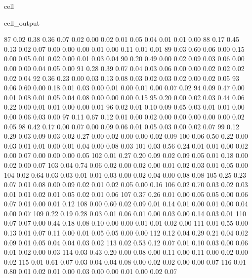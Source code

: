 \documentclass[letterpaper,10pt,english]{jupyterBook}
\begin{document}
\begin{sphinxuseclass}{cell}
\begin{sphinxVerbatimOutput}
\begin{sphinxuseclass}{cell_output}
\begin{sphinxVerbatim}[commandchars=\\\{\}]
        87	0.02 	0.38 	0.36 	0.07 	0.02 	0.00 	0.02 	0.01 	0.05 	0.04 	0.01 	0.01 	0.00
        88	0.17 	0.45 	0.13 	0.02 	0.07 	0.00 	0.00 	0.00 	0.01 	0.00 	0.11 	0.01 	0.01
        89	0.03 	0.60 	0.06 	0.00 	0.15 	0.00 	0.05 	0.01 	0.02 	0.00 	0.01 	0.03 	0.04
        90	0.20 	0.49 	0.00 	0.02 	0.09 	0.03 	0.06 	0.00 	0.00 	0.00 	0.04 	0.05 	0.00
        91	0.28 	0.39 	0.07 	0.04 	0.03 	0.06 	0.00 	0.00 	0.02 	0.02 	0.02 	0.02 	0.04
        92	0.36 	0.23 	0.00 	0.03 	0.13 	0.08 	0.03 	0.02 	0.03 	0.02 	0.00 	0.02 	0.05
        93	0.06 	0.60 	0.00 	0.18 	0.01 	0.03 	0.00 	0.01 	0.00 	0.01 	0.00 	0.07 	0.02
        94	0.09 	0.47 	0.00 	0.01 	0.08 	0.01 	0.05 	0.04 	0.08 	0.00 	0.00 	0.00 	0.15
        95	0.20 	0.00 	0.02 	0.03 	0.44 	0.06 	0.22 	0.00 	0.01 	0.01 	0.00 	0.00 	0.01
        96	0.02 	0.01 	0.10 	0.09 	0.65 	0.03 	0.01 	0.01 	0.00 	0.00 	0.06 	0.03 	0.00
        97	0.11 	0.67 	0.12 	0.01 	0.00 	0.02 	0.00 	0.00 	0.00 	0.00 	0.00 	0.02 	0.05
        98	0.42 	0.17 	0.00 	0.07 	0.00 	0.09 	0.06 	0.01 	0.05 	0.03 	0.00 	0.02 	0.07
        99	0.12 	0.29 	0.03 	0.09 	0.03 	0.02 	0.27 	0.00 	0.02 	0.00 	0.00 	0.02 	0.09
       100	0.06 	0.50 	0.22 	0.00 	0.03 	0.01 	0.01 	0.00 	0.01 	0.04 	0.00 	0.08 	0.03
       101	0.03 	0.56 	0.24 	0.01 	0.01 	0.00 	0.02 	0.00 	0.07 	0.00 	0.00 	0.00 	0.05
       102	0.01 	0.27 	0.20 	0.09 	0.02 	0.09 	0.05 	0.01 	0.18 	0.00 	0.02 	0.00 	0.07
       103	0.04 	0.74 	0.06 	0.02 	0.00 	0.02 	0.00 	0.01 	0.02 	0.03 	0.01 	0.05 	0.00
       104	0.02 	0.64 	0.03 	0.03 	0.01 	0.01 	0.03 	0.00 	0.02 	0.04 	0.00 	0.08 	0.08
       105	0.25 	0.23 	0.07 	0.01 	0.08 	0.00 	0.09 	0.02 	0.01 	0.02 	0.05 	0.00 	0.16
       106	0.02 	0.70 	0.03 	0.02 	0.03 	0.01 	0.01 	0.02 	0.01 	0.05 	0.02 	0.01 	0.06
       107	0.37 	0.26 	0.01 	0.00 	0.05 	0.05 	0.00 	0.06 	0.07 	0.01 	0.00 	0.01 	0.12
       108	0.00 	0.60 	0.02 	0.09 	0.01 	0.14 	0.01 	0.00 	0.01 	0.00 	0.04 	0.00 	0.07
       109	0.22 	0.19 	0.28 	0.03 	0.01 	0.06 	0.01 	0.00 	0.03 	0.00 	0.14 	0.03 	0.01
       110	0.07 	0.07 	0.00 	0.44 	0.18 	0.08 	0.10 	0.00 	0.00 	0.01 	0.01 	0.02 	0.00
       111	0.01 	0.55 	0.00 	0.13 	0.01 	0.07 	0.11 	0.00 	0.01 	0.05 	0.05 	0.00 	0.00
       112	0.12 	0.04 	0.29 	0.21 	0.04 	0.02 	0.09 	0.01 	0.05 	0.04 	0.04 	0.03 	0.02
       113	0.02 	0.53 	0.12 	0.07 	0.01 	0.10 	0.03 	0.00 	0.06 	0.01 	0.02 	0.00 	0.03
       114	0.03 	0.43 	0.20 	0.00 	0.08 	0.00 	0.11 	0.00 	0.11 	0.00 	0.02 	0.00 	0.02
       115	0.01 	0.61 	0.07 	0.03 	0.04 	0.04 	0.08 	0.00 	0.02 	0.02 	0.00 	0.00 	0.07
       116	0.01 	0.80 	0.01 	0.02 	0.01 	0.00 	0.03 	0.00 	0.00 	0.01 	0.00 	0.02 	0.07

\end{sphinxVerbatim}
\end{sphinxuseclass}
\end{sphinxVerbatimOutput}
\end{sphinxuseclass}
\end{document}
